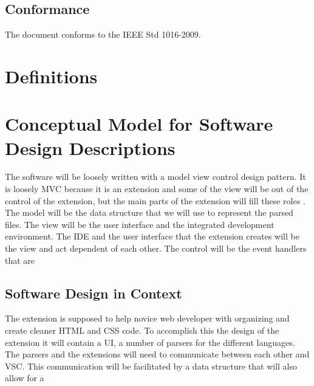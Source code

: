 \documentclass[letterpaper,10pt,titlepage,draftclsnofoot,onecolumn,onesided] {IEEEtran}
\begin{document}
\subsection{Conformance}
The document conforms to the IEEE Std 1016-2009.

\section{Definitions}
\newtheorem{VSC}{An acronym of Visual Studio Code. Visual Studio Code is the IDE for which the postal extension is being built.}
\newtheorem{IDE}{An acronym of Integrated Development Environment.}
\newtheorem{UI}{An acronym of User Interface}
\newtheorem{MVC}{Model-View-Controller (MVC) design pattern assigns objects in an application one of three roles: model, view, or controller. The pattern defines not only the roles objects play in the application, it defines the way objects communicate with each other. Each of the three types of objects is separated from the others by abstract boundaries and communicates with objects of the other types across those boundaries. The collection of objects of a certain MVC type in an application is sometimes referred to as a layer—for example, model layer.\cite{appleMVC}}

\section{Conceptual Model for Software Design Descriptions}
The software will be loosely written with a model view control design pattern.
It is loosely MVC because it is an extension and some of the view will be out of the control of the extension, but the main parts of the extension will fill these roles .
The model will be the data structure that we will use to represent the parsed files. 
The view will be the user interface and the integrated development environment.
The IDE and the user interface that the extension creates will be the view and act dependent of each other.
The control will be the event handlers that are 

\subsection{Software Design in Context}
The extension is supposed to help novice web developer with organizing and create cleaner HTML and CSS code. 
To accomplish this the design of the extension it will contain a UI, a number of parsers for the different languages.
The parsers and the extensions will need to communicate between each other and VSC.
This communication will be facilitated by a data structure that will also allow for a 
\end{document}
